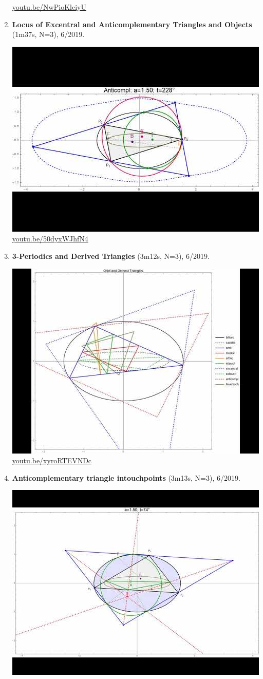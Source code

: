 \documentclass[12pt]{amsart}
\begin{document}
\begin{enumerate}[resume]
\begin{center}
\href{https://youtu.be/NwPioKleiyU}{\url{youtu.be/NwPioKleiyU}}\end{center}
% 
\item \textbf{Locus of Excentral and Anticomplementary Triangles and Objects} (1m37s, N=3), 6/2019. 
\begin{center}\includegraphics[width=.5\textwidth]{pics/50dyxWJhfN4.jpg} \\ 
\href{https://youtu.be/50dyxWJhfN4}{\url{youtu.be/50dyxWJhfN4}}\end{center}
% 
\item \textbf{3-Periodics and Derived Triangles} (3m12s, N=3), 6/2019. 
\begin{center}\includegraphics[width=.5\textwidth]{pics/xyroRTEVNDc.jpg} \\ 
\href{https://youtu.be/xyroRTEVNDc}{\url{youtu.be/xyroRTEVNDc}}\end{center}
% 
\item \textbf{Anticomplementary triangle intouchpoints} (3m13s, N=3), 6/2019. 
\begin{center}\includegraphics[width=.5\textwidth]{pics/NzGKU75-Fuo.jpg} \\ 

\end{center}
\end{enumerate}
\end{document}
